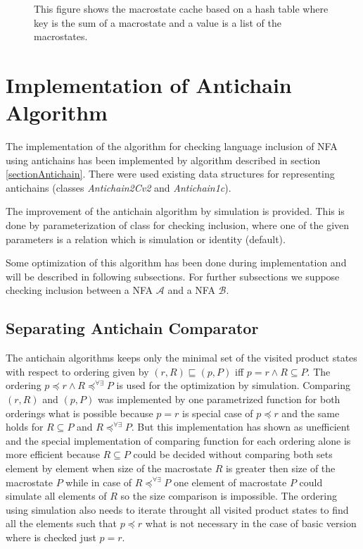 \begin{figure}[bt]
\begin{center}
  
  \caption{This figure shows the macrostate cache based on a hash table where key is the sum of a macrostate and a value is a list of the macrostates.}
  \label{figMacroCache}
\end{center}
\end{figure}

\section{Implementation of Antichain Algorithm}
The implementation of the algorithm for checking language inclusion of NFA using antichains has been implemented by algorithm described in section 
\ref{sectionAntichain}.  There were used existing data structures for representing antichains (classes \emph{Antichain2Cv2} and \emph{Antichain1c}). 

The improvement of the antichain algorithm by simulation is provided. This is done by parameterization of class for checking inclusion, where one of the given 
parameters is a relation which is simulation or identity (default).

Some optimization of this algorithm has been done during implementation and will be described in following subsections. For further subsections we suppose
checking inclusion between a NFA $\mathcal{A}$ and a NFA $\mathcal{B}$.

\subsection{Separating Antichain Comparator}
The antichain algorithms keeps only the minimal set of the visited product states with respect to ordering given by $(r,R)\sqsubseteq (p,P)$
iff $p=r \wedge R \subseteq P$. The ordering $p\preceq r \wedge R\preceq^{\forall\exists}P$ is used for the optimization by simulation.
Comparing $(r,R)$ and $(p,P)$ was implemented by one parametrized function for both orderings what is possible because $p=r$ is special case of $p\preceq r$ 
and the same holds for $R \subseteq P$ and $R\preceq^{\forall\exists}P$. But this implementation has shown as unefficient and the special implementation
of comparing function for each ordering alone is more efficient because $R\subseteq P$ could be decided 
without comparing both sets element by element when size of the macrostate $R$ is greater then size of the macrostate $P$ while in case of
$R\preceq^{\forall\exists}P$ one element of macrostate $P$ could simulate all elements of $R$ so the size comparison is impossible.
The ordering using simulation also needs to iterate throught all visited product states to find all the elements such that $p\preceq r$ what 
is not necessary in the case of basic version where is checked just $p=r$.

